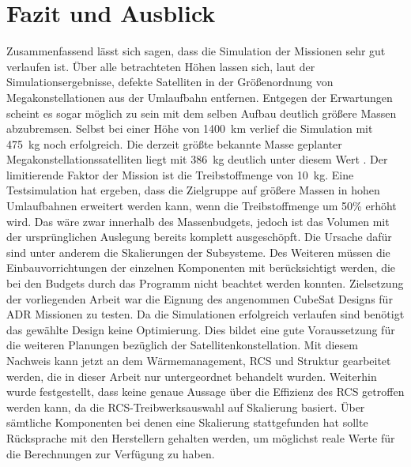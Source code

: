 \chapter{Fazit und Ausblick}
Zusammenfassend lässt sich sagen, dass die Simulation der Missionen sehr gut verlaufen ist. Über alle betrachteten Höhen lassen sich, laut der Simulationsergebnisse, defekte Satelliten in der Größenordnung von Megakonstellationen aus der Umlaufbahn entfernen. Entgegen der Erwartungen scheint es sogar möglich zu sein mit dem selben Aufbau deutlich größere Massen abzubremsen. Selbst bei einer Höhe von \SI{1400}{\kilo\metre} verlief die Simulation mit \SI{475}{\kilogram} noch erfolgreich. Die derzeit größte bekannte Masse geplanter Megakonstellationssatelliten liegt mit \SI{386}{\kilogram} deutlich unter diesem Wert \cite{BenLarbi.2017}. Der limitierende Faktor der Mission ist die Treibstoffmenge von \SI{10}{\kilogram}. Eine Testsimulation hat ergeben, dass die Zielgruppe auf größere Massen in hohen Umlaufbahnen erweitert werden kann, wenn die Treibstoffmenge um \num{50}\% erhöht wird. Das wäre zwar innerhalb des Massenbudgets, jedoch ist das Volumen mit der ursprünglichen Auslegung bereits komplett ausgeschöpft. Die Ursache dafür sind unter anderem die Skalierungen der Subsysteme. Des Weiteren müssen die Einbauvorrichtungen der einzelnen Komponenten mit berücksichtigt werden, die bei den Budgets durch das Programm nicht beachtet werden konnten. Zielsetzung der vorliegenden Arbeit war die Eignung des angenommen CubeSat Designs für ADR Missionen zu testen. Da die  Simulationen erfolgreich verlaufen sind benötigt das gewählte Design keine Optimierung. Dies bildet eine gute Voraussetzung für die weiteren Planungen bezüglich der Satellitenkonstellation. Mit diesem Nachweis kann jetzt an dem Wärmemanagement, RCS und Struktur gearbeitet werden, die in dieser Arbeit nur untergeordnet behandelt wurden. Weiterhin wurde festgestellt, dass keine genaue Aussage über die Effizienz des RCS getroffen werden kann, da die RCS-Treibwerksauswahl auf Skalierung basiert. Über sämtliche Komponenten bei denen eine Skalierung stattgefunden hat sollte Rücksprache mit den Herstellern gehalten werden, um möglichst reale Werte für die Berechnungen zur Verfügung zu haben. 
